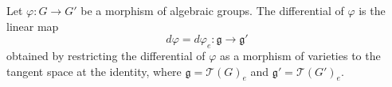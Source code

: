 Let $\varphi: G \to G'$ be a morphism of algebraic groups. The differential of $\varphi$ is the linear map
$$d\varphi = d\varphi_e: \mathfrak{g} \to \mathfrak{g}'$$
obtained by restricting the differential of $\varphi$ as a morphism of varieties to the tangent space at the identity, where $\mathfrak{g} = \mathcal{T}(G)_e$ and $\mathfrak{g}' = \mathcal{T}(G')_e$.
